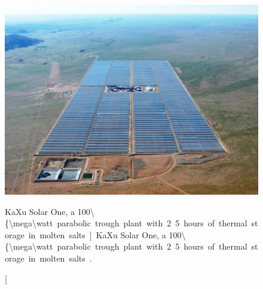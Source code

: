 \begin{figure}[!h]
\centering
\includegraphics[width=1\linewidth]{FIG/KaXu-solar-field}
\caption[KaXu Solar One, a \SI{100\{\mega\watt} parabolic trough plant with 2.5 hours of thermal storage in molten salts.]{KaXu Solar One, a \SI{100\{\mega\watt} parabolic trough plant with 2.5 hours of thermal storage in molten salts \cite{AbengoaSolar2015}.}\label{KaXu-solar-field}
\end{figure}

\pagebreak
